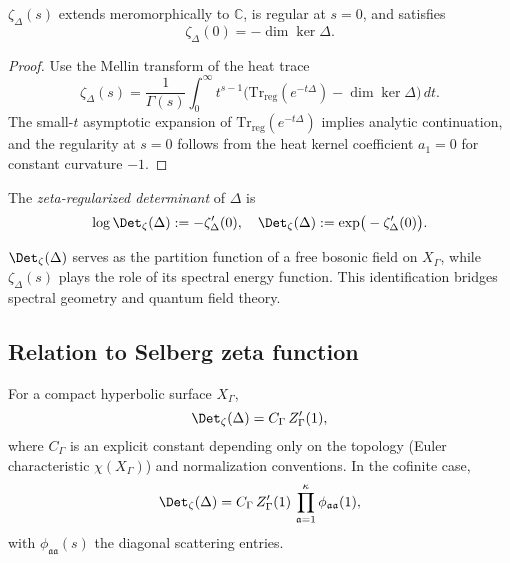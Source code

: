 \begin{theorem}
\label{thm:zeta-analytic-cont}
$\zeta_\Delta(s)$ extends meromorphically to $\mathbb{C}$, is regular at $s=0$, and satisfies
\[
\zeta_\Delta(0)=-\dim\ker\Delta.
\]
\end{theorem}

\begin{proof}\relax
Use the Mellin transform of the heat trace
\[
\zeta_\Delta(s)=\frac{1}{\Gamma(s)}\int_0^\infty t^{s-1}\!\big(
\mathrm{Tr}_{\mathrm{reg}}(e^{-t\Delta})-\dim\ker\Delta
\big)\,dt.
\]
The small-$t$ asymptotic expansion of $\mathrm{Tr}_{\mathrm{reg}}(e^{-t\Delta})$ implies analytic continuation, and the regularity at $s=0$ follows from the heat kernel coefficient $a_1=0$ for constant curvature $-1$. \relax
\end{proof}

\begin{definition}
\label{def:determinant-zeta}
The \emph{zeta-regularized determinant} of $\Delta$ is
\[
\log\Det_\zeta(\Delta)
:= -\zeta_\Delta'(0),
\quad
\Det_\zeta(\Delta):=\exp\!\big(-\zeta_\Delta'(0)\big).
\]
\end{definition}

\begin{remark}
\label{rem:det-physics}
$\Det_\zeta(\Delta)$ serves as the partition function of a free bosonic field on $X_\Gamma$, while $\zeta_\Delta(s)$ plays the role of its spectral energy function. This identification bridges spectral geometry and quantum field theory. \relax
\end{remark}

\subsection{Relation to Selberg zeta function}
\label{subsec:ch4-part6-relation-ZGamma} \relax

\begin{theorem}
\label{thm:determinant-ZGamma}
For a compact hyperbolic surface $X_\Gamma$,
\[
\Det_\zeta(\Delta)
= C_\Gamma\,Z_\Gamma'(1),
\]
where $C_\Gamma$ is an explicit constant depending only on the topology (Euler characteristic $\chi(X_\Gamma)$) and normalization conventions. In the cofinite case,
\[
\Det_\zeta(\Delta)
= C_\Gamma\,Z_\Gamma'(1)\,
\prod_{\mathfrak a=1}^{\kappa} \phi_{\mathfrak a\mathfrak a}(1),
\]
with $\phi_{\mathfrak a\mathfrak a}(s)$ the diagonal scattering entries. \relax
\end{theorem}

